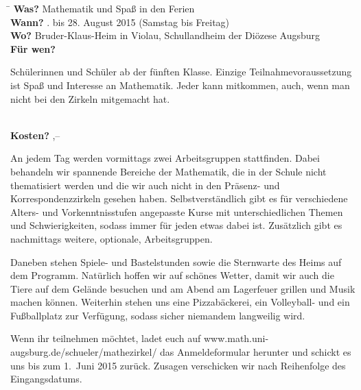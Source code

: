 \documentclass[12pt]{zettel}
\begin{document}
\begin{tabbing}
  \hspace{2.2cm} \= \kill
  \textbf{Was?} \> Mathematik und Spaß in den Ferien \\[0.3em]
  \textbf{Wann?} . bis 28. August 2015 (Samstag bis Freitag) \\[0.3em]
  \textbf{Wo?} \> Bruder-Klaus-Heim in Violau, Schullandheim der Diözese
  Augsburg \\[0.3em]
  \textbf{Für wen?} \> \begin{minipage}[t]{\dimexpr\textwidth-2.3cm}
  Schülerinnen und Schüler ab der fünften Klasse.
  Einzige Teilnahmevoraussetzung ist Spaß und Interesse an
  Mathematik.
  Jeder kann mitkommen, auch, wenn man nicht bei den Zirkeln
  mitgemacht hat.\end{minipage} \\[0.3em]
  \textbf{Kosten?} ,-- \texteuro
\end{tabbing}

An jedem Tag werden vormittags zwei Arbeitsgruppen stattfinden. Dabei behandeln wir spannende
Bereiche der Mathematik, die in der Schule nicht thematisiert werden und die
wir auch nicht in den Präsenz- und Korrespondenzzirkeln gesehen haben.
Selbstverständlich gibt es für verschiedene Alters- und Vorkenntnisstufen angepasste Kurse
mit unterschiedlichen Themen und Schwierigkeiten, sodass immer für jeden
etwas dabei ist. Zusätzlich gibt es nachmittags weitere, optionale,
Arbeitsgruppen.

Daneben stehen Spiele- und Bastelstunden sowie die
Sternwarte des Heims auf dem Programm. Natürlich hoffen wir auf
schönes Wetter, damit wir auch die Tiere auf dem Gelände besuchen
und am Abend am Lagerfeuer grillen und Musik machen können.
Weiterhin stehen uns eine Pizzabäckerei, ein Volleyball- und ein
Fußballplatz zur Verfügung, sodass sicher niemandem langweilig
wird.

\vspace{\medskipamount}

\begin{minipage}{0.58\textwidth}
Wenn ihr teilnehmen möchtet, ladet euch auf
\textsf{www.math.uni-augsburg.de/schueler/mathezirkel/} das
Anmeldeformular herunter und schickt es uns bis zum 1.~Juni 2015 zurück.
Zusagen
verschicken wir nach Reihenfolge des Eingangsdatums.
\end{minipage}

\vspace{\medskipamount}
\end{document}

